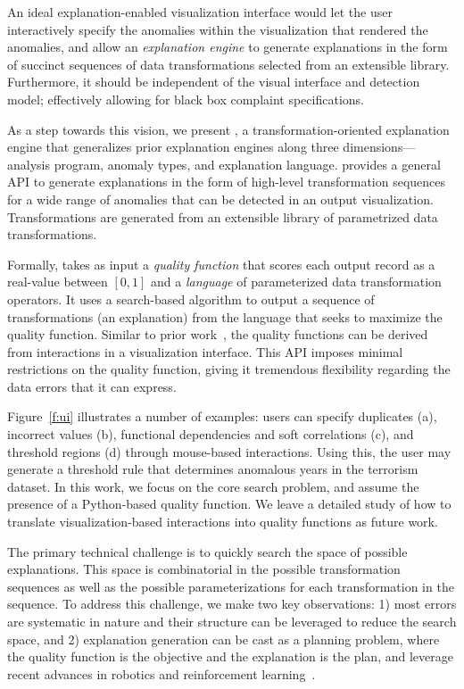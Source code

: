 An ideal explanation-enabled visualization interface would let the user interactively specify the anomalies within the visualization that rendered the anomalies, and allow an {\it explanation engine} to generate explanations in the form of succinct sequences of data transformations selected from an extensible library. Furthermore, it should be independent of the visual interface and detection model; effectively allowing for black box complaint specifications.

As a step towards this vision,  we present \sys, a transformation-oriented explanation engine that generalizes prior explanation engines along three dimensions---analysis program, anomaly types, and explanation language. 
\sys  provides a general API to generate explanations in the form of high-level transformation sequences for a wide range of anomalies that can be detected in an output visualization. Transformations are generated from an extensible library of parametrized data transformations.

Formally, \sys takes as input a {\it quality function} that scores each output record as a real-value between $[0,1]$ and a {\it language} of parameterized data transformation operators.  It uses a search-based algorithm to output a sequence of transformations (an explanation) from the language that seeks to maximize the quality function.  Similar to prior work~\cite{scorpion}, the quality functions can be derived from interactions in a visualization interface.  This API imposes minimal restrictions on the quality function, giving it tremendous flexibility regarding the data errors that it can express.   

Figure~\ref{f:ui} illustrates a number of examples: users can specify duplicates (a), incorrect values (b), functional dependencies and soft correlations (c), and threshold regions (d) through mouse-based interactions.   Using this, the user may generate a threshold rule that determines anomalous years in the terrorism dataset.   In this work, we focus on the core search problem, and assume the presence of a Python-based quality function.  We leave a detailed study of how to translate visualization-based interactions into quality functions as future work.  

The primary technical challenge is to quickly search the space of possible explanations.  This space is combinatorial in the possible transformation sequences as well as the possible parameterizations for each transformation in the sequence.  
To address this challenge, we make two key observations: 1) most errors are systematic in nature and their structure can be leveraged to reduce the search space, and 2) explanation generation can be cast as a planning problem, where the quality function is the objective and the explanation is the plan,  and leverage recent advances in robotics and reinforcement learning~\cite{dpm}.


